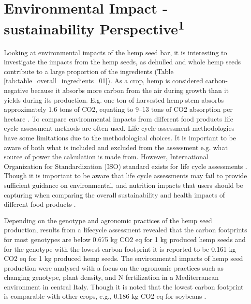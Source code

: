 \section{Environmental Impact - sustainability Perspective\textsuperscript{1}}
Looking at environmental impacts of the hemp seed bar, it is interesting to investigate the impacts from the hemp seeds, as dehulled and whole hemp seeds contribute to a large proportion of the ingredients (Table \ref*{tab:table_overall_ingredients_01}). As a crop, hemp is considered carbon-negative because it absorbs more carbon from the air during growth than it yields during its production. E.g. one ton of harvested hemp stem absorbs approximately 1.6 tons of CO2, equating to 9–13 tons of CO2 absorption per hectare \cite*{HempBook,montero2023hemp}. To compare environmental impacts from different food products life cycle assessment methods are often used. Life cycle assessment methodologies have some limitations due to the methodological choices. It is important to be aware of both what is included and excluded from the assessment e.g. what source of power the calculation is made from. However, International Organization for Standardization (ISO) standard exists for life cycle assessments \cite*{Bjorn2017GoalDefinition}. Though it is important to be aware that life cycle assessments may fail to provide sufficient guidance on environmental, and nutrition impacts that users should be capturing when comparing the overall sustainability and health impacts of different food products \cite*{McLaren2021IntegrationEnvNutritionLCA}.

\vspace{1em}
Depending on the genotype and agronomic practices of the hemp seed production, results from a lifecycle assessment revealed that the carbon footprints for most genotypes are below 0.675 kg CO2 eq for 1 kg produced hemp seeds and for the genotype with the lowest carbon footprint it is reported to be 0.161 kg CO2 eq for 1 kg produced hemp seeds. The environmental impacts of hemp seed production were analysed with a focus on the agronomic practices such as changing genotype, plant density, and N fertilization in a Mediterranean environment in central Italy. Though it is noted that the lowest carbon footprint is comparable with other crops, e.g., 0.186 kg CO2 eq for soybeans \cite*{Campiglia2020HempSeedProductionLCA}.

